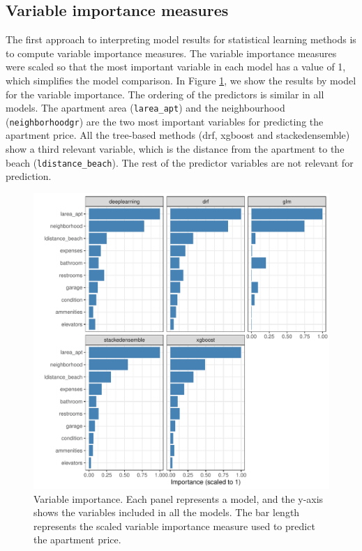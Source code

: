 \documentclass[smallextended,natbib]{svjour3}\usepackage[]{graphicx}\usepackage[]{xcolor}
\newcommand{\1}[1]{\mathbbm{1}_{#1}}
\begin{document}
\subsection{Variable importance measures}
\label{sec:varimp} 
The first approach to interpreting model results for statistical learning methods is to compute variable importance measures. 
The variable importance measures were scaled so that the most important variable in each model has a value of 1, which simplifies the model comparison.  In Figure \ref{fig-imp}, we show  the results  by model for the variable importance. The ordering of the predictors is similar in all models. The apartment area (\texttt{larea\_apt}) and the neighbourhood (\texttt{neighborhoodgr}) are the two most important variables for predicting the apartment price. All the tree-based methods (drf, xgboost and stackedensemble) show a third relevant variable, which is the distance from the apartment to the beach (\texttt{ldistance\_beach}). The rest of the predictor variables are not relevant for prediction.  

\begin{figure}[htpb]
    \centering
    \includegraphics[scale=.9]{figures/fig-importance.pdf}
    \caption{Variable importance. Each panel represents a model, and the y-axis shows the variables included in all the models. The bar length represents the scaled variable importance measure used to predict the apartment price.}
    \label{fig-imp}
\end{figure}
\end{document}
